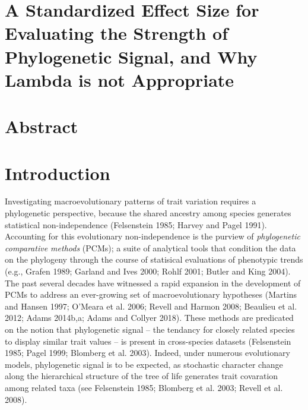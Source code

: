 \documentclass[
]{article}
\author{}
\date{\vspace{-2.5em}}
\begin{document}
\hypertarget{a-standardized-effect-size-for-evaluating-the-strength-of-phylogenetic-signal-and-why-lambda-is-not-appropriate}{%
\section{A Standardized Effect Size for Evaluating the Strength of
Phylogenetic Signal, and Why Lambda is not
Appropriate}\label{a-standardized-effect-size-for-evaluating-the-strength-of-phylogenetic-signal-and-why-lambda-is-not-appropriate}}

\hfill\break

\hypertarget{abstract}{%
\section{Abstract}\label{abstract}}

\newpage

\hypertarget{introduction}{%
\section{Introduction}\label{introduction}}

Investigating macroevolutionary patterns of trait variation requires a
phylogenetic perspective, because the shared ancestry among species
generates statistical non-independence (Felsenstein 1985; Harvey and
Pagel 1991). Accounting for this evolutionary non-independence is the
purview of \emph{phylogenetic comparative methods} (PCMs); a suite of
analytical tools that condition the data on the phylogeny through the
course of statisical evaluations of phenotypic trends (e.g., Grafen
1989; Garland and Ives 2000; Rohlf 2001; Butler and King 2004). The past
several decades have witnessed a rapid expansion in the development of
PCMs to address an ever-growing set of macroevolutionary hypotheses
(Martins and Hansen 1997; O'Meara et al. 2006; Revell and Harmon 2008;
Beaulieu et al. 2012; Adams 2014b,a; Adams and Collyer 2018). These
methods are predicated on the notion that phylogenetic signal -- the
tendancy for closely related species to display similar trait values --
is present in cross-species datasets (Felsenstein 1985; Pagel 1999;
Blomberg et al. 2003). Indeed, under numerous evolutionary models,
phylogenetic signal is to be expected, as stochastic character change
along the hierarchical structure of the tree of life generates trait
covaration among related taxa (see Felsenstein 1985; Blomberg et al.
2003; Revell et al. 2008). \hfill\break
\end{document}
